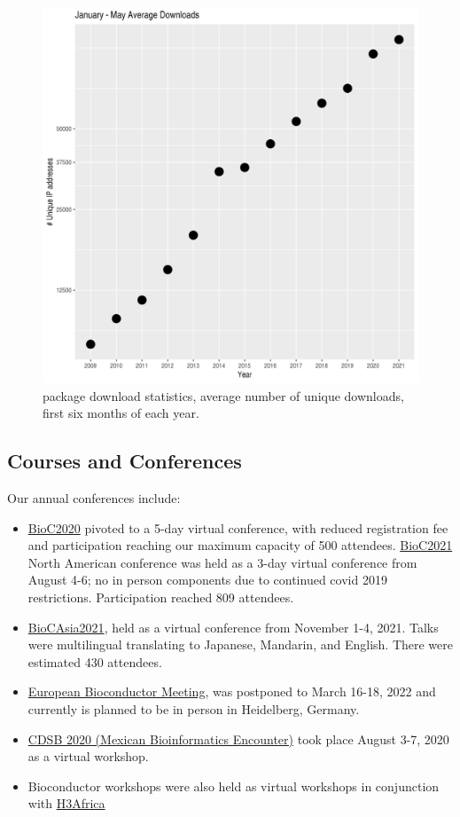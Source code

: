 \documentclass[letterpaper]{article}
\begin{document}
\begin{figure}
  \begin{center}
    \includegraphics[width=.5\textwidth,height=!]{download-stats-2021}
    \caption{\Bioconductor{} package download statistics, average number
      of unique downloads, first six months of each year.}
    \label{fig:download-stats}
  \end{center}
\end{figure}


\subsection{Courses and Conferences}

Our annual conferences include:

\begin{itemize}
\item \href{https://bioc2020.bioconductor.org}{BioC2020}
  pivoted to a 5-day virtual conference, with reduced registration
  fee and participation reaching our maximum capacity of 500
  attendees. \href{https://bioc2021.bioconductor.org}{BioC2021} North American
  conference was held as a 3-day virtual conference from August 4-6; no in
  person components due to continued covid 2019 restrictions. Participation
  reached 809 attendees.    
\item \href{https://biocasia2021.bioconductor.org/}{BioCAsia2021}, held
  as a virtual conference from November 1-4, 2021. Talks were multilingual
  translating to Japanese, Mandarin, and English. There were estimated 430
  attendees.
\item \href{https://eurobioc2022.bioconductor.org/}{European
  Bioconductor Meeting}, was postponed to March 16-18, 2022 and currently is
  planned to be in person in Heidelberg, Germany.
\item \href{https://comunidadbioinfo.github.io/post/cdsb2020-building-workflows-with-rstudio-and-scrnaseq-with-bioconductor/#.YaY3DrtOnmF}{CDSB 2020 (Mexican Bioinformatics Encounter)} took place August 3-7, 2020 as a
  virtual workshop.
\item Bioconductor workshops were also held as virtual workshops in conjunction
  with \href{https://h3africa.org/}{H3Africa}
\end{itemize}
\end{document}
